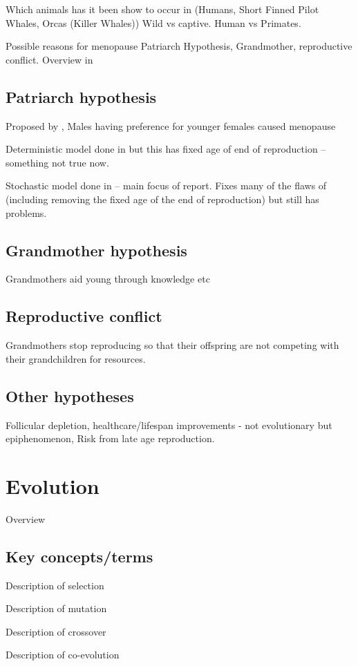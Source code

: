 \documentclass[authoryearcitations]{UoYCSproject}
\begin{document}
Which animals has it been show to occur in (Humans, Short Finned Pilot Whales, Orcas (Killer Whales)) Wild vs captive. Human vs Primates.

Possible reasons for menopause Patriarch Hypothesis, Grandmother, reproductive conflict. Overview in \cite{evolutionPRLS2015}

\subsection{Patriarch hypothesis}
Proposed by \cite{patriarchHypothesis2000} , Males having preference for younger females caused menopause

Deterministic model done in \cite{whyMenMatter2007} but this has fixed age of end of reproduction -- something not true now.

Stochastic model done in \cite{mateChoice2013} -- main focus of report. Fixes many of the flaws of \cite{whyMenMatter2007} (including removing the fixed age of the end of reproduction) but still has problems.


\subsection{Grandmother hypothesis}
Grandmothers aid young through knowledge etc

\subsection{Reproductive conflict}
Grandmothers stop reproducing so that their offspring are not competing with their grandchildren for resources. \cite{repConflictOrca2017}

\subsection{Other hypotheses}
Follicular depletion, healthcare/lifespan improvements - not evolutionary but epiphenomenon, Risk from late age reproduction.

\section{Evolution}
Overview \cite{origin1859}

\subsection{Key concepts/terms}
\begin{description}[style=nextline]
\item[Selection] Description of selection

\item [Mutation] Description of mutation

\item [Crossover] Description of crossover

\item [Coevolution] Description of co-evolution
\end{description}
\end{document}
